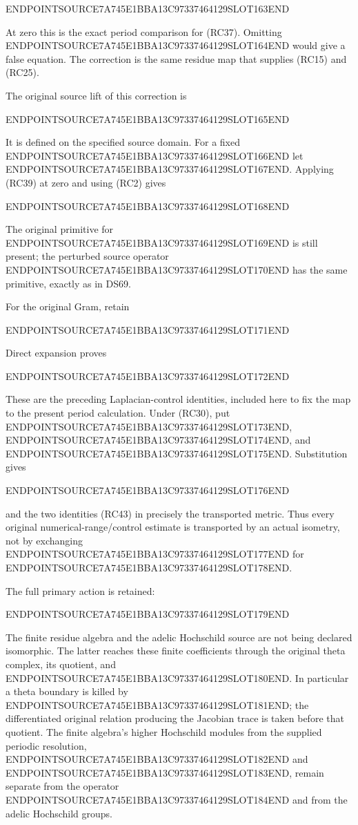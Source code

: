 ENDPOINTSOURCE7A745E1BBA13C97337464129SLOT163END

At zero this is the exact period comparison for (RC37). Omitting ENDPOINTSOURCE7A745E1BBA13C97337464129SLOT164END would give a false equation. The correction is the same residue map that supplies (RC15) and (RC25).

The original source lift of this correction is

ENDPOINTSOURCE7A745E1BBA13C97337464129SLOT165END

It is defined on the specified source domain. For a fixed ENDPOINTSOURCE7A745E1BBA13C97337464129SLOT166END let ENDPOINTSOURCE7A745E1BBA13C97337464129SLOT167END. Applying (RC39) at zero and using (RC2) gives

ENDPOINTSOURCE7A745E1BBA13C97337464129SLOT168END

The original primitive for ENDPOINTSOURCE7A745E1BBA13C97337464129SLOT169END is still present; the perturbed source operator ENDPOINTSOURCE7A745E1BBA13C97337464129SLOT170END has the same primitive, exactly as in DS69.

For the original Gram, retain

ENDPOINTSOURCE7A745E1BBA13C97337464129SLOT171END

Direct expansion proves

ENDPOINTSOURCE7A745E1BBA13C97337464129SLOT172END

These are the preceding Laplacian-control identities, included here to fix the map to the present period calculation. Under (RC30), put ENDPOINTSOURCE7A745E1BBA13C97337464129SLOT173END, ENDPOINTSOURCE7A745E1BBA13C97337464129SLOT174END, and ENDPOINTSOURCE7A745E1BBA13C97337464129SLOT175END. Substitution gives

ENDPOINTSOURCE7A745E1BBA13C97337464129SLOT176END

and the two identities (RC43) in precisely the transported metric. Thus every original numerical-range/control estimate is transported by an actual isometry, not by exchanging ENDPOINTSOURCE7A745E1BBA13C97337464129SLOT177END for ENDPOINTSOURCE7A745E1BBA13C97337464129SLOT178END.

The full primary action is retained:

ENDPOINTSOURCE7A745E1BBA13C97337464129SLOT179END

The finite residue algebra and the adelic Hochschild source are not being declared isomorphic. The latter reaches these finite coefficients through the original theta complex, its quotient, and ENDPOINTSOURCE7A745E1BBA13C97337464129SLOT180END. In particular a theta boundary is killed by ENDPOINTSOURCE7A745E1BBA13C97337464129SLOT181END; the differentiated original relation producing the Jacobian trace is taken before that quotient. The finite algebra's higher Hochschild modules from the supplied periodic resolution, ENDPOINTSOURCE7A745E1BBA13C97337464129SLOT182END and ENDPOINTSOURCE7A745E1BBA13C97337464129SLOT183END, remain separate from the operator ENDPOINTSOURCE7A745E1BBA13C97337464129SLOT184END and from the adelic Hochschild groups.


